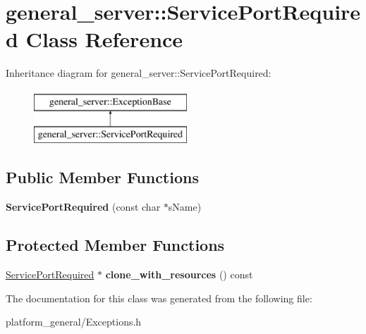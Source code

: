 \hypertarget{classgeneral__server_1_1ServicePortRequired}{\section{general\-\_\-server\-:\-:\-Service\-Port\-Required \-Class \-Reference}
\label{classgeneral__server_1_1ServicePortRequired}
}
\-Inheritance diagram for general\-\_\-server\-:\-:\-Service\-Port\-Required\-:\begin{figure}[H]
\begin{center}
\leavevmode
\includegraphics[height=2.000000cm]{classgeneral__server_1_1ServicePortRequired}
\end{center}
\end{figure}
\subsection*{\-Public \-Member \-Functions}
\begin{DoxyCompactItemize}
\item 
\hypertarget{classgeneral__server_1_1ServicePortRequired_aa853593d181bb21ffd45105381e17435}{{\bfseries \-Service\-Port\-Required} (const char $\ast$s\-Name)}\label{classgeneral__server_1_1ServicePortRequired_aa853593d181bb21ffd45105381e17435}

\end{DoxyCompactItemize}
\subsection*{\-Protected \-Member \-Functions}
\begin{DoxyCompactItemize}
\item 
\hypertarget{classgeneral__server_1_1ServicePortRequired_ad097abef085ecf1f655f3f38927c1fbe}{\hyperlink{classgeneral__server_1_1ServicePortRequired}{\-Service\-Port\-Required} $\ast$ {\bfseries clone\-\_\-with\-\_\-resources} () const }\label{classgeneral__server_1_1ServicePortRequired_ad097abef085ecf1f655f3f38927c1fbe}

\end{DoxyCompactItemize}


\-The documentation for this class was generated from the following file\-:\begin{DoxyCompactItemize}
\item 
platform\-\_\-general/\-Exceptions.\-h\end{DoxyCompactItemize}
